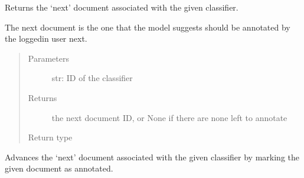 \documentclass[letterpaper,10pt,english]{sphinxmanual}
\begin{document}
\begin{fulllineitems}

\begin{fulllineitems}
\label{\detokenize{autoapi/pine/client/client/index:pine.client.client.PineClient.get_next_document}}
\sphinxAtStartPar
Returns the ‘next’ document associated with the given classifier.

\sphinxAtStartPar
The next document is the one that the model suggests should be annotated by the logged\sphinxhyphen{}in
user next.
\begin{quote}\begin{description}
\item[{Parameters}] \leavevmode
\sphinxAtStartPar
{} \textendash{} str: ID of the classifier

\item[{Returns}] \leavevmode
\sphinxAtStartPar
the next document ID, or None if there are none left to annotate

\item[{Return type}] \leavevmode
\sphinxAtStartPar
{}

\end{description}\end{quote}

\end{fulllineitems}


\begin{fulllineitems}
\label{\detokenize{autoapi/pine/client/client/index:pine.client.client.PineClient.advance_next_document}}
\sphinxAtStartPar
Advances the ‘next’ document associated with the given classifier by marking the
given document as annotated.


\end{fulllineitems}
\end{fulllineitems}
\end{document}
